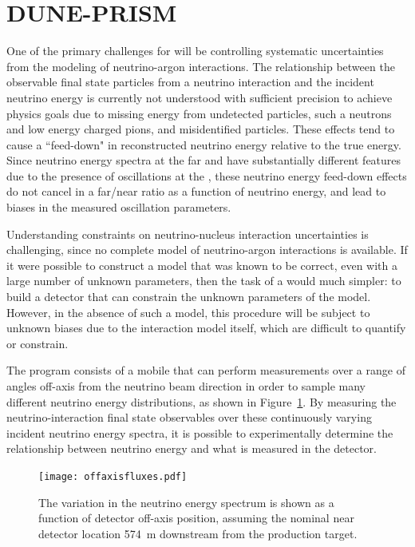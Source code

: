 \section{DUNE-PRISM}
\label{sec:exsum-nd-DP}


One of the primary challenges for  will be controlling systematic uncertainties from the modeling of neutrino-argon interactions. The relationship between the observable final state particles from a neutrino interaction and the incident neutrino energy is currently not understood with sufficient precision to achieve  physics goals due to missing energy from undetected particles, such a neutrons and low energy charged pions, and misidentified particles. These effects tend to cause  a ``feed-down" in reconstructed neutrino energy relative to the true energy. Since neutrino energy spectra at the far and  have substantially different features due to the presence of oscillations at the  , these neutrino energy feed-down effects do not cancel in a far/near ratio as a function of neutrino energy, and lead to biases in the measured oscillation parameters.

Understanding   constraints on neutrino-nucleus interaction uncertainties is challenging, since no complete model of neutrino-argon interactions is available. If it were possible to construct a model that was known to be correct, even with a large number of unknown parameters, then the task of a   would much simpler: to build a detector that can constrain the unknown parameters of the model. However, in the absence of such a model, this procedure will be subject to unknown biases due to the interaction model itself, which are difficult to quantify or constrain.

The    program consists of a mobile   that can perform measurements over a range of angles off-axis from the neutrino beam direction in order to sample many different neutrino energy distributions, as shown in Figure~\ref{fig:offaxisfluxes}. By measuring the neutrino-interaction final state observables over these continuously varying incident neutrino energy spectra, it is possible to experimentally determine the relationship between neutrino energy and what is measured in the detector.

\begin{figure}[h!]
   \begin{center}
      \texttt{[image: offaxisfluxes.pdf]}
      \caption{The variation in the neutrino energy spectrum is shown as a function of detector off-axis position, assuming the nominal near detector location 574~m downstream from the production target.}
      \label{fig:offaxisfluxes}
   \end{center}
\end{figure}


